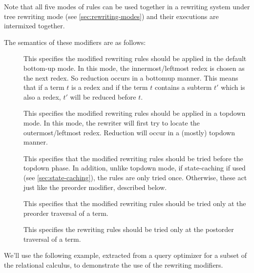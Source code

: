 Note that all five modes of rules can be used together in a rewriting system 
under tree rewriting mode (see \ref{sec:rewriting-modes})
and their executions are intermixed together.  

The semantics of these modifiers are as follows:
\begin{description}
\item[] This specifies the modified rewriting rules should
be applied in the default bottom-up mode.  In this mode, the 
innermost/leftmost redex is chosen as the next redex.  So reduction
occurs in a bottomup manner.  This means that if a term $t$ is a redex
and if the term $t$ contains a subterm $t'$ which is also a redex, 
$t'$ will be reduced before $t$. 
\item[]  This specifies the modified rewriting rules should be
applied in a topdown mode.  In this mode, the rewriter
will first try to locate the outermost/leftmost redex.  Reduction
will occur in a (mostly) topdown manner.
\item[]  This specifies that the modified rewriting rules
should be tried before the topdown phase.   
In addition, unlike topdown mode, if state-caching if used (see
\ref{sec:state-caching}), the rules are only tried once. 
Otherwise, these act just like the preorder modifier, described below. 
\item[]  This specifies that
the modified rewriting rules should be
tried only at the preorder traversal of a term.   
\item[]  This specifies the rewriting rules should be
tried only at the postorder traversal of a term. 
\end{description}

 \label{sec:rewriting-modifier}

We'll use the following example, extracted from a query optimizer for
a subset of the relational calculus, to demonstrate the use
of the rewriting modifiers.

